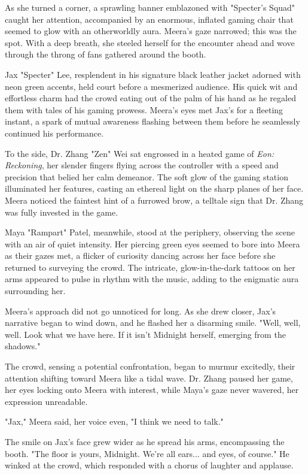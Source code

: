 \documentclass[12pt]{book}
\begin{document}
As she turned a corner, a sprawling banner emblazoned with "Specter's
Squad" caught her attention, accompanied by an enormous, inflated gaming
chair that seemed to glow with an otherworldly aura. Meera's gaze
narrowed; this was the spot. With a deep breath, she steeled herself for
the encounter ahead and wove through the throng of fans gathered around
the booth.

Jax "Specter" Lee, resplendent in his signature black leather jacket
adorned with neon green accents, held court before a mesmerized
audience. His quick wit and effortless charm had the crowd eating out of
the palm of his hand as he regaled them with tales of his gaming
prowess. Meera's eyes met Jax's for a fleeting instant, a spark of
mutual awareness flashing between them before he seamlessly continued
his performance.

To the side, Dr. Zhang "Zen" Wei sat engrossed in a heated game of
\emph{Eon: Reckoning}, her slender fingers flying across the controller
with a speed and precision that belied her calm demeanor. The soft glow
of the gaming station illuminated her features, casting an ethereal
light on the sharp planes of her face. Meera noticed the faintest hint
of a furrowed brow, a telltale sign that Dr. Zhang was fully invested in
the game.

Maya "Rampart" Patel, meanwhile, stood at the periphery, observing the
scene with an air of quiet intensity. Her piercing green eyes seemed to
bore into Meera as their gazes met, a flicker of curiosity dancing
across her face before she returned to surveying the crowd. The
intricate, glow-in-the-dark tattoos on her arms appeared to pulse in
rhythm with the music, adding to the enigmatic aura surrounding her.

Meera's approach did not go unnoticed for long. As she drew closer,
Jax's narrative began to wind down, and he flashed her a disarming
smile. "Well, well, well. Look what we have here. If it isn't Midnight
herself, emerging from the shadows."

The crowd, sensing a potential confrontation, began to murmur excitedly,
their attention shifting toward Meera like a tidal wave. Dr. Zhang
paused her game, her eyes locking onto Meera with interest, while Maya's
gaze never wavered, her expression unreadable.

"Jax," Meera said, her voice even, "I think we need to talk."

The smile on Jax's face grew wider as he spread his arms, encompassing
the booth. "The floor is yours, Midnight. We're all ears... and eyes, of
course." He winked at the crowd, which responded with a chorus of
laughter and applause.
\end{document}
